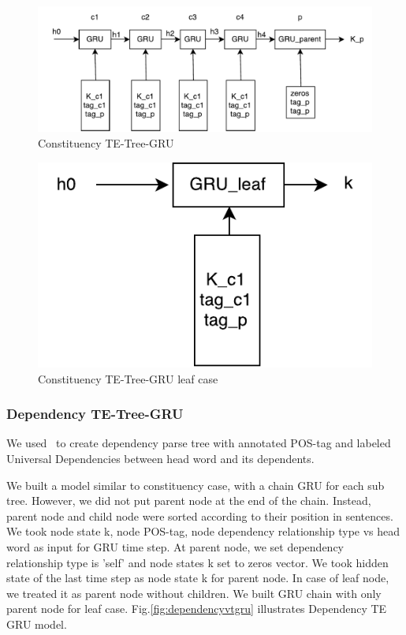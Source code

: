 \begin{figure}[H]
    \centering
    \includegraphics[width=0.9\linewidth]{figure/cvtgru}
    \caption[Constituency TE-Tree-GRU]{Constituency TE-Tree-GRU}
    \label{fig:cvtgru}
\end{figure}

\begin{figure}[H]
    \centering
    \includegraphics[width=0.4\linewidth]{figure/gruleaf}
    \caption[Constituency TE-Tree-GRU leaf case]{Constituency TE-Tree-GRU leaf case}
    \label{fig:gruleaf}
\end{figure}



\subsubsection{Dependency TE-Tree-GRU} \label{sec:VTtreeDependency}
We used~\cite{manning2014stanford} to create dependency parse tree with annotated POS-tag and labeled Universal Dependencies between head word and its dependents.

We built a model similar to constituency case, with a chain GRU for each sub tree. However, we did not put parent node at the end of the chain. Instead, parent node and child node were sorted according to their position in sentences. We took node state k, node POS-tag, node dependency relationship type vs head word as input for GRU time step. At parent node, we set dependency relationship type is 'self' and node states k set to zeros vector. We took hidden state of the last time step as node state k for parent node. In case of leaf node, we treated it as parent node without children. We built GRU chain with only parent node for leaf case. Fig.\ref{fig:dependencyvtgru} illustrates Dependency TE GRU model.

